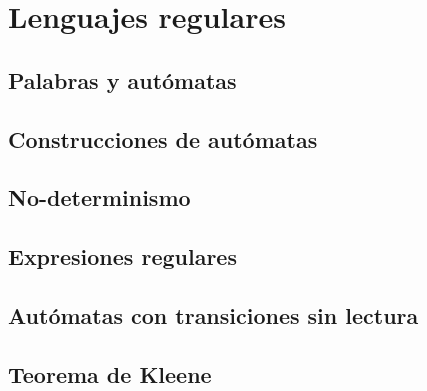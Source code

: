 \section{Lenguajes regulares}

\subsection{Palabras y autómatas}

\subsection{Construcciones de autómatas}

\subsection{No-determinismo}

\subsection{Expresiones regulares}

\subsection{Autómatas con transiciones sin lectura}

\subsection{Teorema de Kleene}